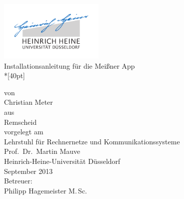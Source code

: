 
\begin{titlepage}
  \centering
  \includegraphics[width=5cm]{fig/unilogo}\\

  \vfill
  \huge
  Installationsanleitung für die Meißner App\\*[40pt]
  \normalsize

  \vfill
  \large
  \normalsize
  von\\
  \Large
  Christian Meter\\

  \vspace{5mm}
  \normalsize
  aus\\ Remscheid\\[1cm]
  vorgelegt am\\[5mm]
  Lehrstuhl für Rechnernetze und Kommunikationssysteme\\
  Prof.\ Dr.\ Martin Mauve\\ 
  Heinrich-Heine-Universität Düsseldorf\\[0.5cm]
  September 2013\\[0.5cm]
  Betreuer:\\
  Philipp Hagemeister M.\,Sc.
    
\end{titlepage}


